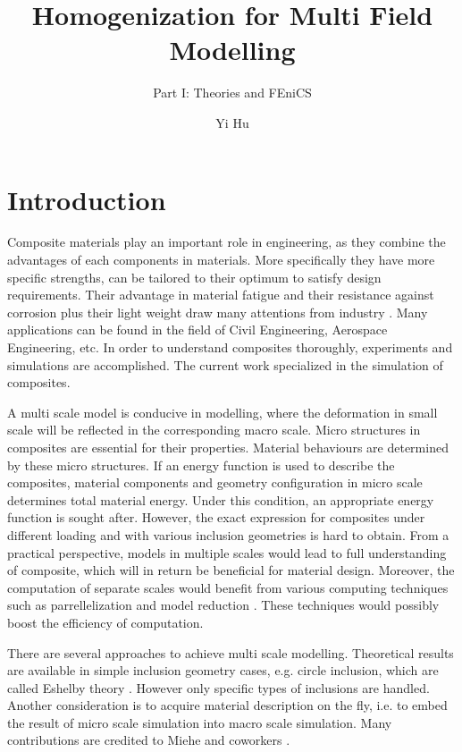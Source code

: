 \documentclass[10pt,a4paper]{scrreprt}
\author{Yi Hu}
\title{Homogenization for Multi Field Modelling}
\subtitle{Part I: Theories and FEniCS}
\begin{document}
\chapter{Introduction}

Composite materials play an important role in engineering, as they combine the advantages of each components in materials. More specifically they have more specific strengths, can be tailored to their optimum to satisfy design requirements. Their advantage in material fatigue and their resistance against corrosion plus their light weight draw many attentions from industry \citep{campbell_structural_2010}. Many applications can be found in the field of Civil Engineering, Aerospace Engineering, etc. In order to understand composites thoroughly, experiments and simulations are accomplished. The current work specialized in the simulation of composites.

A multi scale model is conducive in modelling, where the deformation in small scale will be reflected in the corresponding macro scale. Micro structures in composites are essential for their properties. Material behaviours are determined by these micro structures. If an energy function is used to describe the composites, material components and geometry configuration in micro scale determines total material energy. Under this condition, an appropriate energy function is sought after. However, the exact expression for composites under different loading and with various inclusion geometries is hard to obtain. From a practical perspective, models in multiple scales would lead to full understanding of composite, which will in return be beneficial for material design. Moreover, the computation of separate scales would benefit from various computing techniques such as parrellelization \citep{feyel_fe2_2000} and model reduction \citep{fritzen_reduced_2013}. These techniques would possibly boost the efficiency of computation. 

There are several approaches to achieve multi scale modelling. Theoretical results are available in simple inclusion geometry cases, e.g. circle inclusion, which are called Eshelby theory \citep{li_eshelby_2007}. However only specific types of inclusions are handled. Another consideration is to acquire material description on the fly, i.e. to embed the result of micro scale simulation into macro scale simulation. Many contributions are credited to Miehe and coworkers \citep{miehe_computational_1999-1} \citep{miehe_computational_2003} \citep{miehe_strain-driven_2002} \citep{miehe_computational_2002}.
\end{document}
